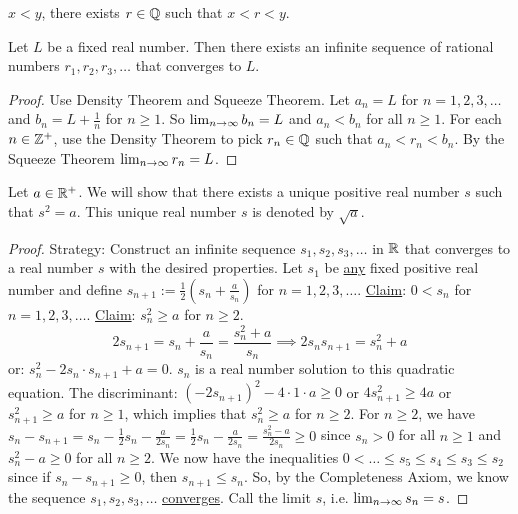 \documentclass[]{article}
\begin{document}
\begin{recall}
	 $x<y$, there exists $r\in\mathbb{Q}$ such that $x<r<y$.
\end{recall}
\begin{proposition}
	Let $L$ be a fixed real number. Then there exists an infinite sequence of rational numbers $r_1,r_2,r_3,\dots$ that converges to $L$.
	\label{prop5}
\end{proposition}
\begin{proof}
	Use Density Theorem and Squeeze Theorem.
	Let $a_n = L$ for $n=1,2,3,\dots$ and $b_n = L+ \frac{1}{n}$ for $n\geq 1$. So $\lim_{n\rightarrow\infty} b_n = L$ and $a_n<b_n$ for all $n\geq 1$. For each $n\in\mathbb{Z}^+$, use the Density Theorem to pick $r_n\in\mathbb{Q}$ such that $a_n<r_n<b_n$. By the Squeeze Theorem $\lim_{n\rightarrow\infty} r_n = L$.
\end{proof}

\begin{example}
	 Let $a\in\mathbb{R}^+$. We will show that there exists a unique positive real number $s$ such that $s^2 = a$. This unique real number $s$ is denoted by $\sqrt{a}$.
\end{example}
\begin{proof}
	Strategy: Construct an infinite sequence $s_1,s_2,s_3,\dots$ in $\mathbb{R}$ that converges to a real number $s$ with the desired properties. Let $s_1$ be \ul{any} fixed positive real number and define $s_{n+1} := \frac{1}{2} \left( s_n + \frac{a}{s_n} \right)$ for $n=1,2,3,\dots$.
	\ul{Claim}: $0<s_n$ for $n=1,2,3,\dots$.
	\ul{Claim}: $s_n^2 \geq a$ for $n\geq 2$.
	$$ 2s_{n+1} = s_n + \frac{a}{s_n} = \frac{s_n^2+a}{s_n} \implies 2 s_n s_{n+1} = s_n^2 + a$$ or: $s_n^2 - 2s_n \cdot s_{n+1} + a = 0$. $s_n$ is a real number solution to this quadratic equation. The discriminant: $(-2s_{n+1})^2 - 4\cdot 1 \cdot a \geq 0$ or $4s_{n+1}^2 \geq 4a$ or $s_{n+1}^2 \geq a$ for $n\geq 1$, which implies that $s_n^2 \geq a$ for $n\geq 2$.
	For $n\geq 2$, we have $s_n-s_{n+1} = s_n - \frac{1}{2} s_n - \frac{a}{2s_n} = \frac{1}{2} s_n - \frac{a}{2s_n} = \frac{s_n^2-a}{2s_n} \geq 0$ since $s_n>0$ for all $n\geq 1$ and %
	$s_n^2-a\geq 0$ for all $n\geq 2$. %
	We now have the inequalities $0<\dots\leq s_5 \leq s_4 \leq s_3 \leq s_2$
	since if $s_n-s_{n+1} \geq 0$, then $s_{n+1}\leq s_n$.
	So, by the Completeness Axiom, we know the sequence $s_1,s_2,s_3,\dots$ \ul{converges}. Call the limit $s$, i.e. $\lim_{n\rightarrow\infty} s_n = s$. %
\end{proof}
\end{document}
